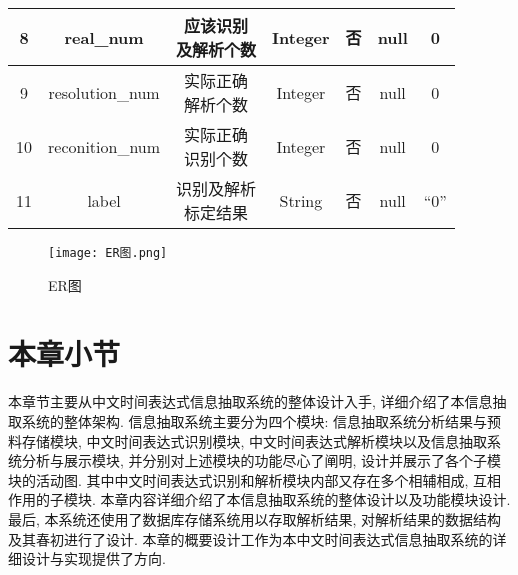 \begin{table}[h]
\begin{tabular}{|*{7}{c|}}
    \hline
    8    & real\_num       & \makecell*[c]{应该识别                                                                               \\及解析个数} & Integer & 否 & null & 0 \\
    \hline
    9    & resolution\_num & \makecell*[c]{实际正确                                                                               \\解析个数} & Integer & 否 & null & 0 \\
    \hline
    10   & reconition\_num & \makecell*[c]{实际正确                                                                               \\识别个数} & Integer & 否 & null  & 0 \\
    \hline
    11   & label           & \makecell*[c]{识别及解析                                                                             \\标定结果} & String & 否 & null & “0” \\
    \hline
  \end{tabular}
\end{table}


\begin{figure}[h]
  \centering
  \texttt{[image: ER图.png]}
  \caption{ER图}
  \label{fig:badge}
\end{figure}

\section{本章小节}

本章节主要从中文时间表达式信息抽取系统的整体设计入手, 详细介绍了本信息抽取系统的整体架构.
信息抽取系统主要分为四个模块: 信息抽取系统分析结果与预料存储模块, 中文时间表达式识别模块, 中文时间表达式解析模块以及信息抽取系统分析与展示模块, 并分别对上述模块的功能尽心了阐明, 设计并展示了各个子模块的活动图.
其中中文时间表达式识别和解析模块内部又存在多个相辅相成, 互相作用的子模块. 本章内容详细介绍了本信息抽取系统的整体设计以及功能模块设计.
最后, 本系统还使用了数据库存储系统用以存取解析结果, 对解析结果的数据结构及其春初进行了设计. 本章的概要设计工作为本中文时间表达式信息抽取系统的详细设计与实现提供了方向.

